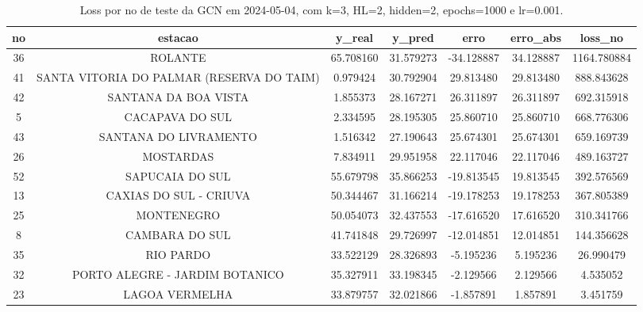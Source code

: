 \begin{table}[h]
\centering
\caption{Loss por no de teste da GCN em 2024-05-04, com k=3, HL=2, hidden=2, epochs=1000 e lr=0.001.}
\label{tab:gcn_loss_k3_hl2_h2_e1000_d20240504}
\begin{tabular}{ccccccc}
\toprule
no & estacao & y\_real & y\_pred & erro & erro\_abs & loss\_no \\
\midrule
36 & ROLANTE & 65.708160 & 31.579273 & -34.128887 & 34.128887 & 1164.780884 \\
41 & SANTA VITORIA DO PALMAR (RESERVA DO TAIM) & 0.979424 & 30.792904 & 29.813480 & 29.813480 & 888.843628 \\
42 & SANTANA DA BOA VISTA & 1.855373 & 28.167271 & 26.311897 & 26.311897 & 692.315918 \\
5 & CACAPAVA DO SUL & 2.334595 & 28.195305 & 25.860710 & 25.860710 & 668.776306 \\
43 & SANTANA DO LIVRAMENTO & 1.516342 & 27.190643 & 25.674301 & 25.674301 & 659.169739 \\
26 & MOSTARDAS & 7.834911 & 29.951958 & 22.117046 & 22.117046 & 489.163727 \\
52 & SAPUCAIA DO SUL & 55.679798 & 35.866253 & -19.813545 & 19.813545 & 392.576569 \\
13 & CAXIAS DO SUL - CRIUVA & 50.344467 & 31.166214 & -19.178253 & 19.178253 & 367.805389 \\
25 & MONTENEGRO & 50.054073 & 32.437553 & -17.616520 & 17.616520 & 310.341766 \\
8 & CAMBARA DO SUL & 41.741848 & 29.726997 & -12.014851 & 12.014851 & 144.356628 \\
35 & RIO PARDO & 33.522129 & 28.326893 & -5.195236 & 5.195236 & 26.990479 \\
32 & PORTO ALEGRE - JARDIM BOTANICO & 35.327911 & 33.198345 & -2.129566 & 2.129566 & 4.535052 \\
23 & LAGOA VERMELHA & 33.879757 & 32.021866 & -1.857891 & 1.857891 & 3.451759 \\
\bottomrule
\end{tabular}
\end{table}
